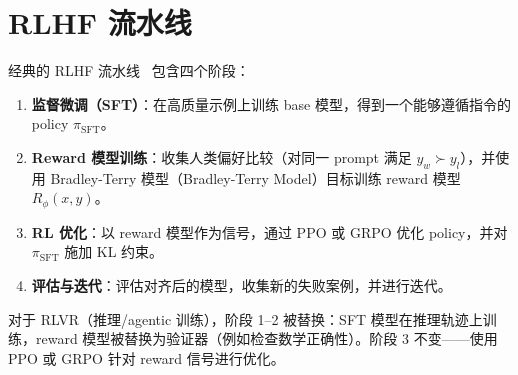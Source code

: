 \section{RLHF 流水线}
\label{the-rlhf-pipeline}
\label{kl-divergence-in-rlhf}

经典的 RLHF 流水线~\cite{ouyang2022training} 包含四个阶段：

\begin{enumerate}
  \item \textbf{监督微调（SFT）}：在高质量示例上训练 base 模型，得到一个能够遵循指令的 policy $\pi_{\text{SFT}}$。
  \item \textbf{Reward 模型训练}：收集人类偏好比较（对同一 prompt 满足 $y_w \succ y_l$），并使用 Bradley-Terry 模型（Bradley-Terry Model）目标训练 reward 模型 $R_\phi(x, y)$。
  \item \textbf{RL 优化}：以 reward 模型作为信号，通过 PPO 或 GRPO 优化 policy，并对 $\pi_{\text{SFT}}$ 施加 KL 约束。
  \item \textbf{评估与迭代}：评估对齐后的模型，收集新的失败案例，并进行迭代。
\end{enumerate}

对于 RLVR（推理/agentic 训练），阶段 1--2 被替换：SFT 模型在推理轨迹上训练，reward 模型被替换为验证器（例如检查数学正确性）。阶段 3 不变——使用 PPO 或 GRPO 针对 reward 信号进行优化。

